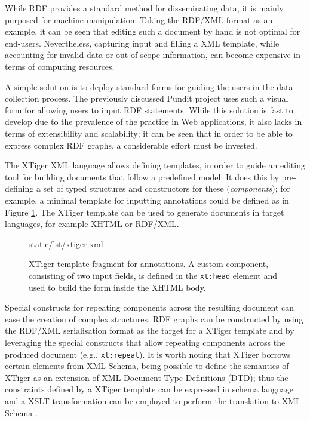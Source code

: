 While RDF provides a standard method for disseminating data, it is mainly
purposed for machine manipulation. Taking the RDF/XML format as an example, it
can be seen that editing such a document by hand is not optimal for end-users.
Nevertheless, capturing input and filling a XML template, while accounting
for invalid data or out-of-scope information, can become expensive in terms of
computing resources.

A simple solution is to deploy standard forms for guiding the users in the data
collection process. The previously discussed Pundit project uses such a visual
form for allowing users to input RDF statements. While this solution is fast to
develop due to the prevalence of the practice in Web applications, it also
lacks in terms of extensibility and scalability; it can be seen that in order
to be able to express complex RDF graphs, a considerable effort must be
invested.

The XTiger \cite{ref:xtiger} XML language allows defining templates, in order
to guide an editing tool for building documents that follow a predefined model.
It does this by pre-defining a set of typed structures and constructors for
these (\textit{components}); for example, a minimal template for inputting
annotations could be defined as in Figure \ref{lst:xtiger}. The XTiger template
can be used to generate documents in target languages, for example XHTML or
RDF/XML.

\begin{figure}[!ht]
  
    {static/lst/xtiger.xml}
  \caption[XTiger template fragment for annotations]
            {XTiger template fragment for annotations. A custom component,
             consisting of two input fields, is defined in the \texttt{xt:head}
             element and used to build the form inside the XHTML body.}
  \label{lst:xtiger}
\end{figure}

Special constructs for repeating components across the resulting document can
ease the creation of complex structures. RDF graphs can be constructed by using
the RDF/XML serialisation format as the target for a XTiger template and by
leveraging the special constructs that allow repeating components across the
produced document (e.g., \texttt{xt:repeat}). It is worth noting that XTiger
borrows certain elements from XML Schema, being possible to define the
semantics of XTiger as an extension of XML Document Type Definitions (DTD);
thus the constraints defined by a XTiger template can be expressed in schema
language and a XSLT transformation can be employed to perform the translation
to XML Schema \cite{ref:quint}.

